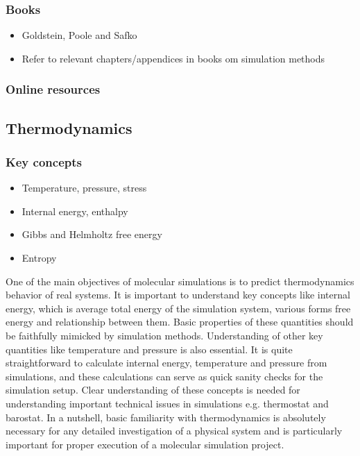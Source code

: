 \documentclass[9pt,bestpractices]{livecoms}
\begin{document}
\subsubsection{Books}
\begin{itemize}
\item Goldstein, Poole and Safko
\item Refer to relevant chapters/appendices in books om simulation methods
\end{itemize}

\subsubsection{Online resources}


\subsection{Thermodynamics}
\subsubsection{Key concepts}
\begin{itemize}
\item Temperature, pressure, stress
\item Internal energy, enthalpy
\item Gibbs and Helmholtz free energy
\item Entropy
\end{itemize}

One of the main objectives of molecular simulations is to predict thermodynamics behavior of real systems. It is important to understand key concepts like internal energy, which is average total energy of the simulation system, various forms free energy and relationship between them. Basic properties of these quantities should be faithfully mimicked by simulation methods. Understanding of other key quantities like temperature and pressure is also essential. It is quite straightforward to calculate internal energy, temperature and pressure from simulations, and these calculations can serve as quick sanity checks for the simulation setup. Clear understanding of these concepts is needed for understanding important technical issues in simulations e.g. thermostat and barostat.
In a nutshell, basic familiarity with thermodynamics is absolutely necessary for any detailed investigation of a physical system and is particularly important for proper execution of a molecular simulation project.
\end{document}
